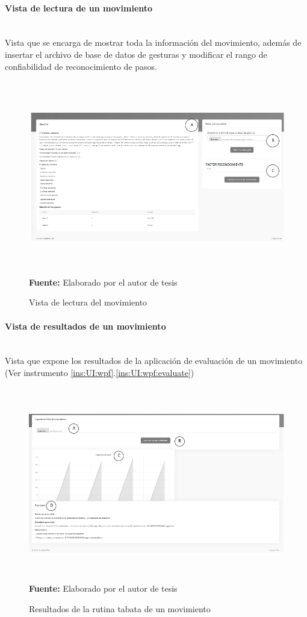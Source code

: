 \paragraph{Vista de lectura de un movimiento}\mbox{} \\ \label{ins:UI:web:read}
Vista que se encarga de mostrar toda la informaci\'on del movimiento, adem\'as de insertar el archivo de base de datos de gesturas y modificar el rango de confiabilidad de reconocimiento de pasos.
\begin{figure}[H]
	\caption{Vista de lectura del movimiento}
	\label{fig:viewRead}
	\centering
	\includegraphics[width=460px,height=320px]{graphics/web-read.PNG} \\
	\textbf{Fuente:} Elaborado por el autor de tesis
\end{figure}
\paragraph{Vista de resultados de un movimiento}\mbox{} \\ \label{ins:UI:web:result}
Vista que expone los resultados de la aplicaci\'on de evaluaci\'on de un movimiento (Ver instrumento \ref{ins:UI:wpf}.\ref{ins:UI:wpf:evaluate})
\begin{figure}[H]
	\caption{Resultados de la rutina tabata de un movimiento}
	\label{fig:resultsTabata}
	\centering
	\includegraphics[width=460px,height=320px]{graphics/web-results.PNG} \\
	\textbf{Fuente:} Elaborado por el autor de tesis
\end{figure}

